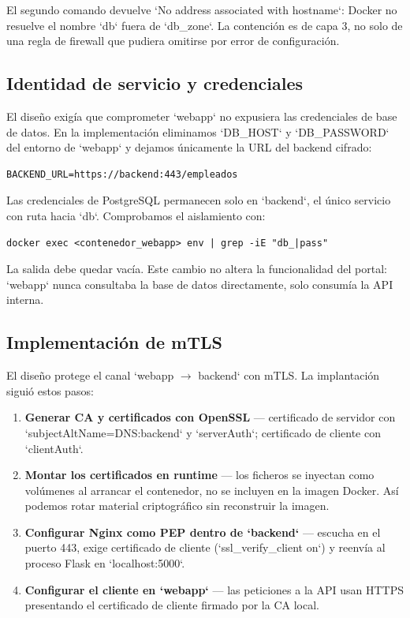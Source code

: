 \documentclass[11pt,spanish,listoffigures,listoftables]{tfgetsinf}
\begin{document}
        El segundo comando devuelve `No address associated with hostname`: Docker no resuelve el nombre `db` fuera de `db\_zone`. La contención es de capa 3, no solo de una regla de firewall que pudiera omitirse por error de configuración.
        
        \subsection{Identidad de servicio y credenciales}
        El diseño exigía que comprometer `webapp` no expusiera las credenciales de base de datos. En la implementación eliminamos `DB\_HOST` y `DB\_PASSWORD` del entorno de `webapp` y dejamos únicamente la URL del backend cifrado:
        
        \begin{lstlisting}
BACKEND_URL=https://backend:443/empleados
        \end{lstlisting}
        
        Las credenciales de PostgreSQL permanecen solo en `backend`, el único servicio con ruta hacia `db`. Comprobamos el aislamiento con:
        
        \begin{lstlisting}
docker exec <contenedor_webapp> env | grep -iE "db_|pass"
        \end{lstlisting}
        
        La salida debe quedar vacía. Este cambio no altera la funcionalidad del portal: `webapp` nunca consultaba la base de datos directamente, solo consumía la API interna.
        
        \subsection{Implementación de mTLS}
        \label{sec:5.3.3}
        El diseño protege el canal `webapp $\rightarrow$ backend` con mTLS. La implantación siguió estos pasos:
        \begin{enumerate}
            \item \textbf{Generar CA y certificados con OpenSSL} — certificado de servidor con `subjectAltName=DNS:backend` y `serverAuth`; certificado de cliente con `clientAuth`.
            \item \textbf{Montar los certificados en runtime} — los ficheros se inyectan como volúmenes al arrancar el contenedor, no se incluyen en la imagen Docker. Así podemos rotar material criptográfico sin reconstruir la imagen.
            \item \textbf{Configurar Nginx como PEP dentro de `backend`} — escucha en el puerto 443, exige certificado de cliente (`ssl\_verify\_client on`) y reenvía al proceso Flask en `localhost:5000`.
            \item \textbf{Configurar el cliente en `webapp`} — las peticiones a la API usan HTTPS presentando el certificado de cliente firmado por la CA local.
        \end{enumerate}
        
\end{document}

